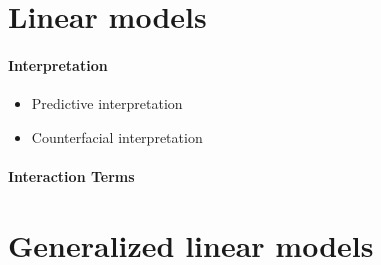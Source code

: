 \section{Linear models}

\paragraph{Interpretation}
\begin{itemize}
\item Predictive interpretation
\item Counterfacial interpretation
\end{itemize}
\paragraph{Interaction Terms}
\section{Generalized linear models}